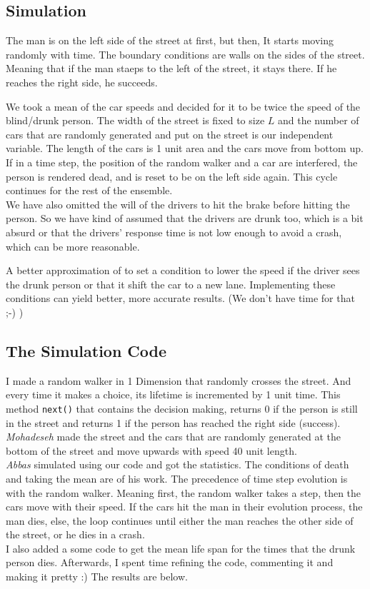\documentclass[12pt]{article}
\begin{document}
	\subsection{Simulation}
	The man is on the left side of the street at first, but then, It starts moving randomly with time.
	The boundary conditions are walls on the sides of the street. Meaning that if the man staeps to the left of the street, it stays there. If he reaches the right side, he succeeds.
	
	We took a mean of the car speeds and decided for it to be twice the speed of the blind/drunk person.
	The width of the street is fixed to size $L$ and the number of cars that are randomly generated and put on
	the street is our independent variable. The length of the cars is 1 unit area and the  
	cars move from bottom up. If in a time step, the position of the
	random walker and a car are interfered, the person is rendered dead, and is reset to be on the left side again. This cycle continues for the rest of the ensemble.\\
	We have also omitted the will of the drivers to hit the brake before hitting the person. So we have kind of assumed that the drivers are drunk too, which is a bit absurd or that the drivers' response time is not low enough to avoid a crash, which can be more reasonable.
	
	A better approximation of to set a condition to lower the speed if the driver sees the drunk person or that it
	shift the car to a new lane. Implementing these conditions can yield better, more accurate results. (We don't have time for that ;-) )
	\subsection{The Simulation Code}
	I made a random walker in 1 Dimension that randomly crosses the street. And every time it makes a choice, its lifetime is incremented by 1 unit time. This method \texttt{next()} that contains the decision making,
	returns 0 if the person is still in the street and returns 1 if the person has reached the right side (success).\\
	\emph{Mohadeseh} made the street and the cars that are randomly generated at the bottom of the street and move upwards with speed 40 unit length.\\
	\emph{Abbas} simulated using our code and got the statistics. The conditions of death and taking the mean are of his work. The precedence of time step evolution is with the random walker. Meaning first, the
	random walker takes a step, then the cars move with their speed. If the cars hit the man in their evolution
	process, the man dies, else, the loop continues until either the man reaches the other side of the street,
	or he dies in a crash.\\
	I also added a some code to get the mean life span for the times that the drunk person dies.
	Afterwards, I spent time refining the code, commenting it and making it pretty :)
	The results are below.
	
\end{document}
